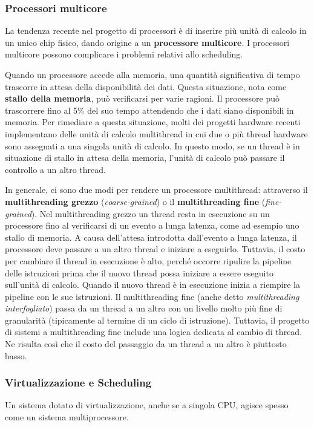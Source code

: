 \documentclass[11pt,a4paper]{article}
\begin{document}
\subsubsection{Processori multicore}
La tendenza recente nel progetto di processori è di inse­rire più unità di calcolo in un unico chip fisico, dando origine a un \textbf{processore multicore}.
I processori multicore possono complicare i problemi relativi allo scheduling.

Quando un
processore accede alla memoria, una quantità significativa di tempo trascorre in attesa della
disponibilità dei dati. Questa situazione, nota come \textbf{stallo della memoria}, può verificarsi
per varie ragioni.
Il processore può trascorrere fino al 5\% del suo tempo attendendo che i dati siano disponibili in memoria. Per rimediare
a questa situazione, molti dei progetti hardware recenti implementano delle unità di calcolo
multithread in cui due o più thread hardware sono assegnati a una singola unità di calcolo.
In questo modo, se un thread è in situazione di stallo in attesa della memoria, l'unità di cal­colo può passare il controllo a un altro thread.

In generale, ci sono due modi per rendere un processore multithread: attraverso il \textbf{multithreading grezzo} (\emph{coarse-grained}) o il \textbf{multithreading fine} (\emph{fine-grained}). Nel multithreading grezzo un thread resta in esecuzione su un processore fino al verificarsi di un evento a lunga latenza, come ad esempio uno stallo di memoria. A causa dell'attesa introdotta dal­l'evento a lunga latenza, il processore deve passare a un altro thread e iniziare a eseguirlo. Tut­tavia, il costo per cambiare il thread in esecuzione è alto, perché occorre ripulire la pipeline
delle istruzioni prima che il nuovo thread possa iniziare a essere eseguito sull'unità di calcolo.
Quando il nuovo thread è in esecuzione inizia a riempire la pipeline con le sue istruzioni. Il
multithreading fine (anche detto \emph{multithreading interfogliato}) passa da un thread a un altro
con un livello molto più fine di granularità (tipicamente al termine di un ciclo di istruzione).
Tuttavia, il progetto di sistemi a multithreading fine include una logica dedicata al cambio di
thread. Ne risulta così che il costo del passaggio da un thread a un altro è piuttosto basso.

\subsubsection{Virtualizzazione e Scheduling}
Un sistema dotato di virtualizzazione, anche se a singola CPU, agisce spesso come un sistema
multiprocessore.
\end{document}
